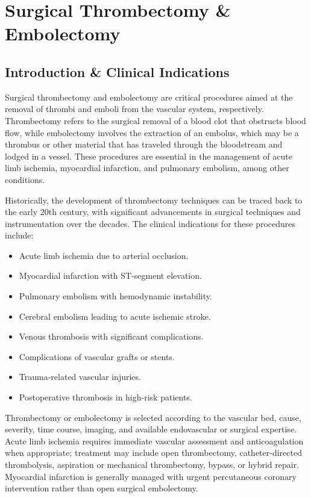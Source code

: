 \chapter{Surgical Thrombectomy \& Embolectomy}

\section*{Introduction \& Clinical Indications}

Surgical thrombectomy and embolectomy are critical procedures aimed at the removal of thrombi and emboli from the vascular system, respectively. Thrombectomy refers to the surgical removal of a blood clot that obstructs blood flow, while embolectomy involves the extraction of an embolus, which may be a thrombus or other material that has traveled through the bloodstream and lodged in a vessel. These procedures are essential in the management of acute limb ischemia, myocardial infarction, and pulmonary embolism, among other conditions.

Historically, the development of thrombectomy techniques can be traced back to the early 20th century, with significant advancements in surgical techniques and instrumentation over the decades. The clinical indications for these procedures include:

\begin{itemize}
    \item Acute limb ischemia due to arterial occlusion.
    \item Myocardial infarction with ST-segment elevation.
    \item Pulmonary embolism with hemodynamic instability.
    \item Cerebral embolism leading to acute ischemic stroke.
    \item Venous thrombosis with significant complications.
    \item Complications of vascular grafts or stents.
    \item Trauma-related vascular injuries.
    \item Postoperative thrombosis in high-risk patients.
\end{itemize}

Thrombectomy or embolectomy is selected according to the vascular bed, cause, severity, time course, imaging, and available endovascular or surgical expertise. Acute limb ischemia requires immediate vascular assessment and anticoagulation when appropriate; treatment may include open thrombectomy, catheter-directed thrombolysis, aspiration or mechanical thrombectomy, bypass, or hybrid repair. Myocardial infarction is generally managed with urgent percutaneous coronary intervention rather than open surgical embolectomy.

